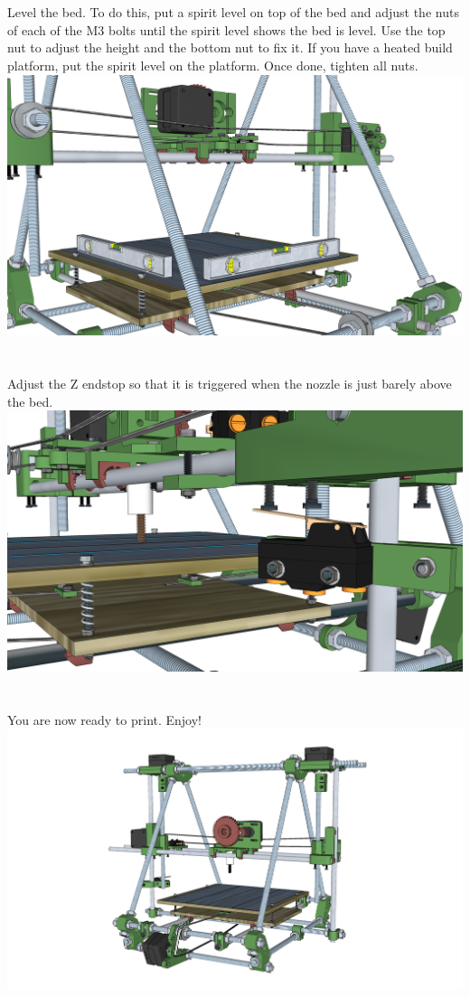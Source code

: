 \documentclass[twoside,openany,a4paper,titlepage]{memoir}
\begin{document}
	\section{}
	Level the bed. To do this, put a spirit level on top of the bed and adjust the nuts of each of the M3 bolts
	until the spirit level shows the bed is level. Use the top nut to adjust the height and the bottom nut to fix
	it. If you have a heated build platform, put the spirit level on the platform. Once done, tighten all nuts.\\
	\includegraphics[width=1\linewidth]{graphics/ch11_8.png}
	
	\section{}
	Adjust the Z endstop so that it is triggered when the nozzle is just
	barely above the bed.\\
	\includegraphics[width=1\linewidth]{graphics/ch11_9.png}
	
	\section{}
	You are now ready to print. Enjoy!\\
	\includegraphics[width=1\linewidth]{graphics/ch11_10.png}
	
	\printindex
\end{document}
